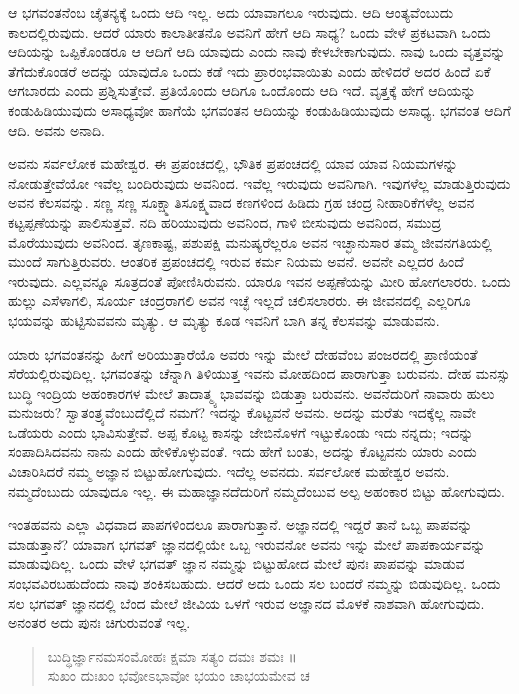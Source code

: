 ಆ ಭಗವಂತನೆಂಬ ಚೈತನ್ಯಕ್ಕೆ ಒಂದು ಆದಿ ಇಲ್ಲ. ಅದು ಯಾವಾಗಲೂ ಇರುವುದು. ಆದಿ ಆಂತ್ಯವೆಂಬುದು ಕಾಲದಲ್ಲಿರುವುದು. ಆದರೆ ಯಾರು ಕಾಲಾತೀತನೊ ಅವನಿಗೆ ಹೇಗೆ ಆದಿ ಸಾಧ್ಯ? ಒಂದು ವೇಳೆ ಪ್ರಕಟವಾಗಿ ಒಂದು ಆದಿಯನ್ನು ಒಪ್ಪಿಕೊಂಡರೂ ಆ ಆದಿಗೆ ಆದಿ ಯಾವುದು ಎಂದು ನಾವು ಕೇಳಬೇಕಾಗುವುದು. ನಾವು ಒಂದು ವೃತ್ತವನ್ನು ತೆಗೆದುಕೊಂಡರೆ ಅದನ್ನು ಯಾವುದೊ ಒಂದು ಕಡೆ ಇದು ಪ್ರಾರಂಭವಾಯಿತು ಎಂದು ಹೇಳಿದರೆ ಅದರ ಹಿಂದೆ ಏಕೆ ಆಗಬಾರದು ಎಂದು ಪ್ರಶ್ನಿಸುತ್ತೇವೆ. ಪ್ರತಿಯೊಂದು ಆದಿಗೂ ಒಂದೊಂದು ಆದಿ ಇದೆ. ವೃತ್ತಕ್ಕೆ ಹೇಗೆ ಆದಿಯನ್ನು ಕಂಡುಹಿಡಿಯುವುದು ಅಸಾಧ್ಯವೋ ಹಾಗೆಯೆ ಭಗವಂತನ ಆದಿಯನ್ನು ಕಂಡುಹಿಡಿಯುವುದು ಅಸಾಧ್ಯ. ಭಗವಂತ ಆದಿಗೆ ಆದಿ. ಅವನು ಅನಾದಿ.

ಅವನು ಸರ್ವಲೋಕ ಮಹೇಶ್ವರ. ಈ ಪ್ರಪಂಚದಲ್ಲಿ, ಭೌತಿಕ ಪ್ರಪಂಚದಲ್ಲಿ ಯಾವ ಯಾವ ನಿಯಮಗಳನ್ನು ನೋಡುತ್ತೇವೆಯೋ ಇವೆಲ್ಲ ಬಂದಿರುವುದು ಅವನಿಂದ. ಇವೆಲ್ಲ ಇರುವುದು ಅವನಿಗಾಗಿ. ಇವುಗಳೆಲ್ಲ ಮಾಡುತ್ತಿರುವುದು ಅವನ ಕೆಲಸವನ್ನು. ಸಣ್ಣ ಸಣ್ಣ ಸೂಕ್ಷ್ಮಾತಿಸೂಕ್ಷ್ಮವಾದ ಕಣಗಳಿಂದ ಹಿಡಿದು ಗ್ರಹ ಚಂದ್ರ ನೀಹಾರಿಕೆಗಳೆಲ್ಲ ಅವನ ಕಟ್ಟಪ್ಪಣೆಯನ್ನು ಪಾಲಿಸುತ್ತವೆ. ನದಿ ಹರಿಯುವುದು ಅವನಿಂದ, ಗಾಳಿ ಬೀಸುವುದು ಅವನಿಂದ, ಸಮುದ್ರ ಮೊರೆಯುವುದು ಅವನಿಂದ. ತೃಣಕಾಷ್ಟ, ಪಶುಪಕ್ಷಿ ಮನುಷ್ಯರೆಲ್ಲರೂ ಅವನ ಇಚ್ಛಾನುಸಾರ ತಮ್ಮ ಜೀವನಗತಿಯಲ್ಲಿ ಮುಂದೆ ಸಾಗುತ್ತಿರುವರು. ಆಂತರಿಕ ಪ್ರಪಂಚದಲ್ಲಿ ಇರುವ ಕರ್ಮ ನಿಯಮ ಅವನೆ. ಅವನೇ ಎಲ್ಲದರ ಹಿಂದೆ ಇರುವುದು. ಎಲ್ಲವನ್ನೂ ಸೂತ್ರದಂತೆ ಪೋಣಿಸಿರುವನು. ಯಾರೂ ಇವನ ಅಪ್ಪಣೆಯನ್ನು ಮೀರಿ ಹೋಗಲಾರರು. ಒಂದು ಹುಲ್ಲು ಎಸೆಳಾಗಲಿ, ಸೂರ್ಯ ಚಂದ್ರರಾಗಲಿ ಅವನ ಇಚ್ಛೆ ಇಲ್ಲದೆ ಚಲಿಸಲಾರರು. ಈ ಜೀವನದಲ್ಲಿ ಎಲ್ಲರಿಗೂ ಭಯವನ್ನು ಹುಟ್ಟಿಸುವವನು ಮೃತ್ಯು. ಆ ಮೃತ್ಯು ಕೂಡ ಇವನಿಗೆ ಬಾಗಿ ತನ್ನ ಕೆಲಸವನ್ನು ಮಾಡುವನು.

ಯಾರು ಭಗವಂತನನ್ನು ಹೀಗೆ ಅರಿಯುತ್ತಾರೆಯೊ ಅವರು ಇನ್ನು ಮೇಲೆ ದೇಹವೆಂಬ ಪಂಜರದಲ್ಲಿ ಪ್ರಾಣಿಯಂತೆ ಸೆರೆಯಲ್ಲಿರುವುದಿಲ್ಲ. ಭಗವಂತನ್ನು ಚೆನ್ನಾಗಿ ತಿಳಿಯುತ್ತ ಇವನು ಮೋಹದಿಂದ ಪಾರಾಗುತ್ತಾ ಬರುವನು. ದೇಹ ಮನಸ್ಸು ಬುದ್ಧಿ ಇಂದ್ರಿಯ ಅಹಂಕಾರಗಳ ಮೇಲೆ ತಾದಾತ್ಮ್ಯ ಭಾವವನ್ನು ಬಿಡುತ್ತಾ ಬರುವನು. ಅವನೆದುರಿಗೆ ನಾವಾರು ಹುಲು ಮನುಜರು? ಸ್ವಾತಂತ್ರ್ಯವೆಂಬುದೆಲ್ಲಿದೆ ನಮಗೆ? ಇದನ್ನು ಕೊಟ್ಟವನೆ ಅವನು. ಅದನ್ನು ಮರೆತು ಇದಕ್ಕೆಲ್ಲ ನಾವೇ ಒಡೆಯರು ಎಂದು ಭಾವಿಸುತ್ತೇವೆ. ಅಪ್ಪ ಕೊಟ್ಟ ಕಾಸನ್ನು ಜೇಬಿನೊಳಗೆ ಇಟ್ಟುಕೊಂಡು ಇದು ನನ್ನದು; ಇದನ್ನು ಸಂಪಾದಿಸಿದವನು ನಾನು ಎಂದು ಹೇಳಿಕೊಳ್ಳುವಂತೆ. ಇದು ಹೇಗೆ ಬಂತು, ಅದನ್ನು ಕೊಟ್ಟವನು ಯಾರು ಎಂದು ವಿಚಾರಿಸಿದರೆ ನಮ್ಮ ಅಜ್ಞಾನ ಬಿಟ್ಟುಹೋಗುವುದು. ಇದೆಲ್ಲ ಅವನದು. ಸರ್ವಲೋಕ ಮಹೇಶ್ವರ ಅವನು. ನಮ್ಮದೆಂಬುದು ಯಾವುದೂ ಇಲ್ಲ. ಈ ಮಹಾಜ್ಞಾನದೆದುರಿಗೆ ನಮ್ಮದೆಂಬುವ ಅಲ್ಪ ಅಹಂಕಾರ ಬಿಟ್ಟು ಹೋಗುವುದು.

ಇಂತಹವನು ಎಲ್ಲಾ ವಿಧವಾದ ಪಾಪಗಳಿಂದಲೂ ಪಾರಾಗುತ್ತಾನೆ. ಅಜ್ಞಾನದಲ್ಲಿ ಇದ್ದರೆ ತಾನೆ ಒಬ್ಬ ಪಾಪವನ್ನು ಮಾಡುತ್ತಾನೆ? ಯಾವಾಗ ಭಗವತ್ ಜ್ಞಾನದಲ್ಲಿಯೇ ಒಬ್ಬ ಇರುವನೋ ಅವನು ಇನ್ನು ಮೇಲೆ ಪಾಪಕಾರ್ಯವನ್ನು ಮಾಡುವುದಿಲ್ಲ. ಒಂದು ವೇಳೆ ಭಗವತ್ ಜ್ಞಾನ ನಮ್ಮನ್ನು ಬಿಟ್ಟುಹೋದ ಮೇಲೆ ಪುನಃ ಪಾಪವನ್ನು ಮಾಡುವ ಸಂಭವವಿರಬಹುದೆಂದು ನಾವು ಶಂಕಿಸಬಹುದು. ಆದರೆ ಅದು ಒಂದು ಸಲ ಬಂದರೆ ನಮ್ಮನ್ನು ಬಿಡುವುದಿಲ್ಲ. ಒಂದು ಸಲ ಭಗವತ್ ಜ್ಞಾನದಲ್ಲಿ ಬೆಂದ ಮೇಲೆ ಜೀವಿಯ ಒಳಗೆ ಇರುವ ಅಜ್ಞಾನದ ಮೊಳಕೆ ನಾಶವಾಗಿ ಹೋಗುವುದು. ಅನಂತರ ಅದು ಪುನಃ ಚಿಗುರುವಂತೆ ಇಲ್ಲ.

\begin{verse}
ಬುದ್ಧಿರ್ಜ್ಞಾನಮಸಂಮೋಹಃ ಕ್ಷಮಾ ಸತ್ಯಂ ದಮಃ ಶಮಃ ॥\\ಸುಖಂ ದುಃಖಂ ಭವೋಽಭಾವೋ ಭಯಂ ಚಾಭಯಮೇವ ಚ 
\end{verse}

